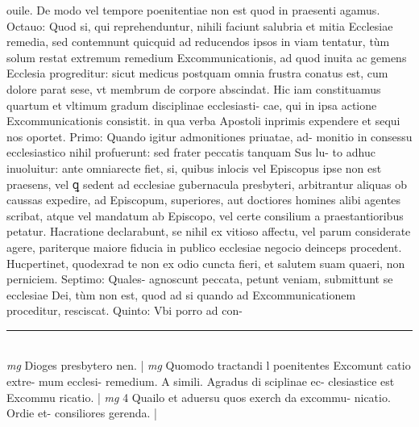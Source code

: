 \documentclass{article}
\begin{document}
\begin{pages}
ouile. De modo vel tempore poenitentiae non est quod in praesenti agamus. Octauo: Quod si, qui reprehenduntur, nihili faciunt salubria et mitia Ecclesiae remedia, sed contemnunt quicquid ad reducendos ipsos in viam tentatur, tùm solum restat extremum remedium Excommunicationis, ad quod inuita ac gemens Ecclesia progreditur: sicut medicus postquam omnia frustra conatus est, cum dolore parat sese, vt membrum de corpore abscindat. Hic iam constituamus quartum et vltimum gradum disciplinae ecclesiasti- cae, qui in ipsa actione Excommunicationis consistit. in qua verba Apostoli inprimis expendere et sequi nos oportet. Primo: Quando igitur admonitiones priuatae, ad- monitio in consessu ecclesiastico nihil profuerunt: sed frater peccatis tanquam Sus lu- to adhuc inuoluitur: ante omniarecte fiet, si, quibus inlocis vel Episcopus ipse non est praesens, vel ꝗ sedent ad ecclesiae gubernacula presbyteri, arbitrantur aliquas ob caussas expedire, ad Episcopum, superiores, aut doctiores homines alibi agentes scribat, atque  vel mandatum ab Episcopo, vel certe consilium a praestantioribus petatur. Hacratione declarabunt, se nihil ex vitioso affectu, vel parum considerate agere, pariterque  maiore fiducia in publico ecclesiae negocio deinceps procedent. Hucpertinet, quodexrad te non ex odio cuncta fieri, et salutem suam quaeri, non perniciem. Septimo: Quales- agnoscunt peccata, petunt veniam, submittunt se ecclesiae Dei, tùm non est, quod ad si quando ad Excommunicationem proceditur, resciscat. Quinto: Vbi porro ad con-  \pend
\vspace{0.5cm}\noindent
\vspace{0.2cm}\rule{1cm}{0.2pt}\\ 
\hspace{0.2cm}\textit{mg}
\footnotesize Dioges presbytero nen. 
\normalsize| 
\hspace{0.2cm}\textit{mg}
\footnotesize Quomodo tractandi l poenitentes Excomunt catio extre- mum ecclesi- remedium. A simili. Agradus di sciplinae ec- clesiastice est Excommu ricatio. 
\normalsize| 
\hspace{0.2cm}\textit{mg}
\footnotesize 4 Quailo et aduersu quos exerch da excommu- nicatio. Ordie et- consiliores gerenda. 
\normalsize| 

\end{pages}
\end{document}
